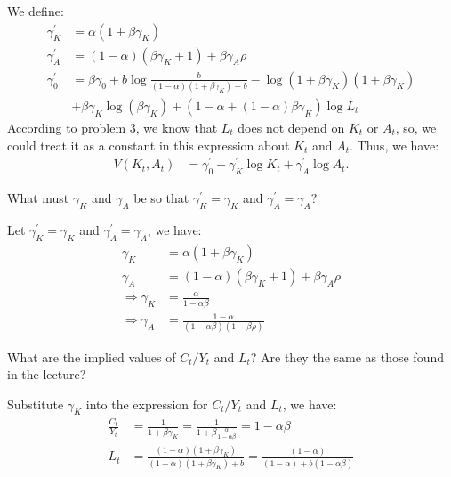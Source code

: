 \begin{solution}
    We define: 
    \begin{align*}
        \gamma_K^{\prime} &= \alpha (1+ \beta \gamma_K) \\
        \gamma_A^{\prime} &= (1-\alpha )(\beta \gamma_K + 1) + \beta \gamma_A \rho \\
        \gamma_0^{\prime} &= \beta \gamma_0 + b\log{\frac{b}{(1-\alpha)(1 + \beta \gamma_K) + b}} - \log{(1+\beta \gamma_K)}(1+ \beta \gamma_K) \\
        &+ \beta \gamma_K\log{(\beta \gamma_K)} + (1-\alpha + (1-\alpha )\beta \gamma_K)\log{L_t}
    \end{align*}
    According to problem 3, we know that $L_t$ does not depend on $K_t$ or $A_t$, so, we could treat it as a constant in this expression about $K_t$ and $A_t$. Thus, we have:
    \begin{align*}
        V(K_t, A_t) &= \gamma_0^{\prime} + \gamma_K^{\prime}\log{K_t} + \gamma_A^{\prime}\log{A_t}.
    \end{align*}
\end{solution}

\begin{problem}[5]
    What must $\gamma_K$ and $\gamma_A$ be so that $\gamma_K^\prime=\gamma_K$ and $\gamma_A^{\prime}=\gamma_A?$
\end{problem}

\begin{solution}
    Let $\gamma_K^{\prime} = \gamma_K$ and $\gamma_A^{\prime} = \gamma_A$, we have:
    \begin{align*}
        \gamma_K &= \alpha (1+ \beta \gamma_K) \\
        \gamma_A &= (1-\alpha )(\beta \gamma_K + 1) + \beta \gamma_A \rho \\
        \Rightarrow \gamma_K &= \frac{\alpha}{1-\alpha \beta} \\
        \Rightarrow \gamma_A &= \frac{1-\alpha}{(1-\alpha \beta)(1 -\beta \rho )}
    \end{align*}
\end{solution}

\begin{problem}[6]
    What are the implied values of $C_t/Y_t$ and $L_t$? Are they the same as those found in the lecture?
\end{problem}

\begin{solution}
    Substitute $\gamma_K$ into the expression for $C_t/Y_t$ and $L_t$, we have:
    \begin{align*}
        \frac{C_t}{Y_t} &= \frac{1}{1 + \beta \gamma_K} = \frac{1}{1 + \beta \frac{\alpha}{1-\alpha \beta}} = 1-\alpha \beta \\
        L_t &= \frac{(1-\alpha)(1 + \beta \gamma_K)}{(1-\alpha)(1 + \beta \gamma_K) + b} = \frac{(1-\alpha)}{(1-\alpha) + b(1-\alpha \beta )}
    \end{align*}

\end{solution}
